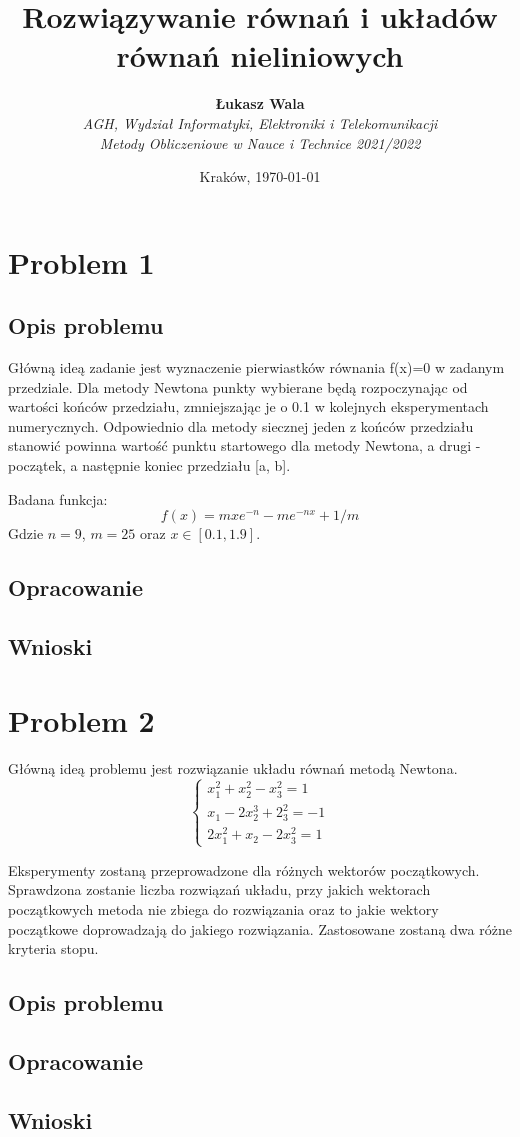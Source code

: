 \documentclass{article}
\title{Rozwiązywanie równań i układów równań nieliniowych}
\author{\textbf{Łukasz Wala}\\
    \textit{AGH, Wydział Informatyki, Elektroniki i Telekomunikacji} \\
    \textit{Metody Obliczeniowe w Nauce i Technice 2021/2022}}
\date{Kraków, \today}
\begin{document}
\maketitle

\section{Problem 1}
\subsection{Opis problemu}
Główną ideą zadanie jest wyznaczenie pierwiastków równania f(x)=0 w zadanym przedziale.
Dla metody Newtona punkty wybierane będą rozpoczynając od wartości końców przedziału, zmniejszając je o 0.1 w kolejnych eksperymentach numerycznych.
Odpowiednio dla metody siecznej jeden z końców przedziału stanowić powinna wartość punktu startowego dla 
metody Newtona, a drugi - początek, a następnie koniec przedziału [a, b].

Badana funkcja:
\[f(x)=mxe^{-n}-me^{-nx}+1/m\]
Gdzie $n=9$, $m=25$ oraz $x\in [0.1,1.9]$.

\subsection{Opracowanie}
\subsection{Wnioski}

\section{Problem 2}
Główną ideą problemu jest rozwiązanie układu równań metodą Newtona.
\[
\begin{cases}
    x^2_1+x^2_2-x^2_3=1 \\
    x_1-2x^3_2+2^2_3=-1 \\
    2x_1^2+x_2-2x^2_3=1
\end{cases}
\]

Eksperymenty zostaną przeprowadzone dla różnych wektorów początkowych. 
Sprawdzona zostanie liczba rozwiązań układu, przy jakich wektorach początkowych metoda 
nie zbiega do rozwiązania oraz to jakie wektory początkowe doprowadzają do jakiego 
rozwiązania. Zastosowane zostaną dwa różne kryteria stopu.

\subsection{Opis problemu}
\subsection{Opracowanie}
\subsection{Wnioski}
\end{document}
